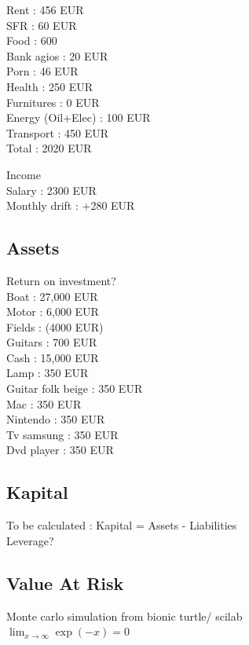 \documentclass[8pt]{article} %
\begin{document}
Rent : 456 EUR\\
SFR : 60 EUR\\
Food : 600\\
Bank agios : 20 EUR\\
Porn : 46 EUR\\
Health : 250 EUR\\
Furnitures : 0 EUR\\
Energy (Oil+Elec) : 100 EUR\\
Transport : 450 EUR\\

Total : 2020 EUR

Income \\

Salary : 2300 EUR\\

Monthly drift : +280 EUR

\subsection{Assets}

Return on investment?\\

Boat : 27,000 EUR\\
Motor : 6,000 EUR\\
Fields : (4000 EUR)\\
Guitars : 700 EUR\\
Cash : 15,000 EUR\\
Lamp : 350 EUR\\
Guitar folk beige : 350 EUR\\
Mac : 350 EUR\\
Nintendo : 350 EUR\\
Tv samsung : 350 EUR\\
Dvd player : 350 EUR\\

\subsection{Kapital}
To be calculated : Kapital = Assets - Liabilities\\
Leverage?\\

\subsection{Value At Risk}

Monte carlo simulation from bionic turtle/ scilab\\
$\lim_{x \to \infty} \exp(-x) = 0$
\end{document}

